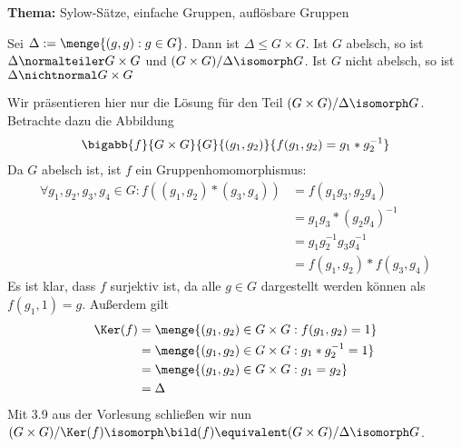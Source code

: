 \begin{uebungsblatt}
	\textbf{Thema:} Sylow-Sätze, einfache Gruppen, auflösbare Gruppen
	\vspace{0.5cm}
	\setcounter{taskcount}{65}
	\begin{uebung} [Vorbereitung]
		Sei $\Delta := \menge{(g,g) : g \in G}$. Dann ist $\Delta \leq G \times G$. Ist $G$ abelsch, so ist $\Delta \normalteiler G \times G$ und $(G \times G)/\Delta \isomorph G$. Ist $G$ nicht abelsch, so ist $\Delta \nichtnormal G \times G$
	\end{uebung}
	\begin{loesung}
		Wir präsentieren hier nur die Lösung für den Teil $(G \times G)/\Delta \isomorph G$. Betrachte dazu die Abbildung
		\begin{align*}
			\bigabb{f}{G \times G}{G}{(g_1, g_2)}{f(g_1, g_2) = g_1 * g_2^{-1}}
		\end{align*}
		Da $G$ abelsch ist, ist $f$ ein Gruppenhomomorphismus:
		\begin{align*}
			\forall g_1, g_2, g_3, g_4 \in G : f((g_1, g_2) * (g_3, g_4)) 
			&= f(g_1 g_3, g_2 g_4) \\
			&= g_1 g_3 *\left( g_2 g_4 \right)^{-1} \\
			&= g_1 g_2^{-1} g_3 g_4^{-1} \\
			&= f(g_1, g_2) * f(g_3, g_4)
		\end{align*}
		Es ist klar, dass $f$ surjektiv ist, da alle $g \in G$ dargestellt werden können als $f(g_1, 1) = g$. Außerdem gilt
		\begin{align*}
			\Ker(f) &= \menge{(g_1, g_2) \in G \times G : f(g_1, g_2) = 1} \\
			&= \menge{(g_1, g_2) \in G \times G : g_1 * g_2^{-1} = 1} \\
			&= \menge{(g_1, g_2) \in G \times G : g_1 = g_2} \\
			&= \Delta
		\end{align*}
		Mit 3.9 aus der Vorlesung schließen wir nun $(G \times G) / \Ker(f) \isomorph \bild(f) \equivalent (G \times G) / \Delta \isomorph G$.
	\end{loesung}


\end{uebungsblatt}
